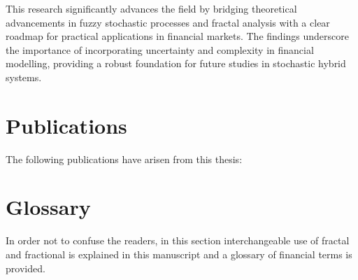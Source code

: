 \documentclass[12pt,a4paper]{report}
\numberwithin{equation}{section}
\begin{document}
This research significantly advances the field by bridging theoretical
advancements in fuzzy stochastic processes and fractal analysis with a
clear roadmap for practical applications in financial markets. The
findings underscore the importance of incorporating uncertainty and
complexity in financial modelling, providing a robust foundation for
future studies in stochastic hybrid systems.

\cleardoublepage
\tableofcontents
\cleardoublepage
\listoffigures
\cleardoublepage
\listoftables
\cleardoublepage

\chapter*{Publications}

The following publications have arisen from this thesis:

\begin{refsection}
\nocite{P1,P2,P3,P4}
\printbibliography[heading=none, env=publist, category=ownpubs]
\end{refsection}

\hypertarget{glossary--and--list--of--terms}{%
\chapter*{Glossary}\label{glossary--and--list--of--terms}
}

In order not to confuse the readers, in this section
interchangeable use of fractal and fractional is explained in this manuscript and a
glossary of financial terms is provided.
\end{document}

